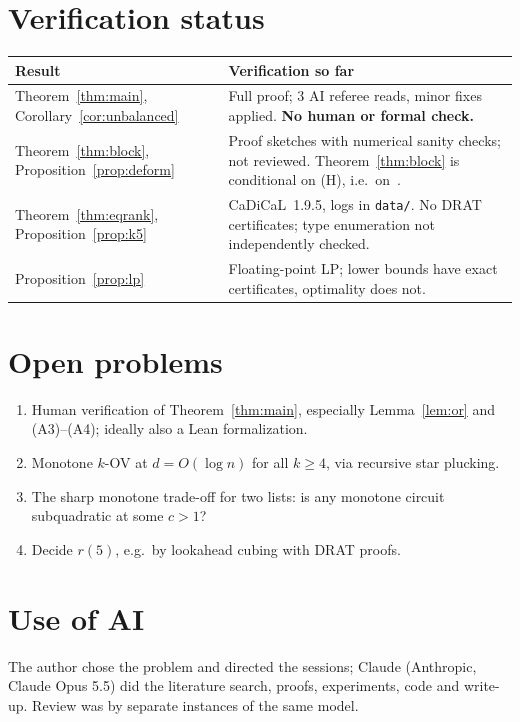 \documentclass[11pt,a4paper]{article}
\theoremstyle{plain}
\theoremstyle{definition}
\theoremstyle{remark}
\newcommand{\code}[1]{\texttt{\small #1}}
\begin{document}
\section{Verification status}
\begin{center}
\renewcommand{\arraystretch}{1.15}
\begin{tabularx}{\textwidth}{@{}l X@{}}
\toprule
Result & Verification so far\\
\midrule
Theorem~\ref{thm:main}, Corollary~\ref{cor:unbalanced} & Full proof; 3 AI referee reads, minor fixes
applied. \textbf{No human or formal check.}\\
Theorem~\ref{thm:block}, Proposition~\ref{prop:deform} & Proof sketches with numerical sanity checks; not
reviewed. Theorem~\ref{thm:block} is conditional on (H), i.e.\ on~\cite{OpenAI26,Anthropic26}.\\
Theorem~\ref{thm:eqrank}, Proposition~\ref{prop:k5} & CaDiCaL~1.9.5, logs in \code{data/}. No DRAT certificates; type
enumeration not independently checked.\\
Proposition~\ref{prop:lp} & Floating-point LP; lower bounds have exact certificates, optimality does not.\\
\bottomrule
\end{tabularx}
\end{center}

\section{Open problems}
\begin{enumerate}
  \item Human verification of Theorem~\ref{thm:main}, especially Lemma~\ref{lem:or} and (A3)--(A4); ideally also a
    Lean formalization.
  \item Monotone $k$-OV at $d=O(\log n)$ for all $k\ge4$, via recursive star plucking.
  \item The sharp monotone trade-off for two lists: is any monotone circuit subquadratic at some $c>1$?
  \item Decide $r(5)$, e.g.\ by lookahead cubing with DRAT proofs.
\end{enumerate}

\section*{Use of AI}
The author chose the problem and directed the sessions; Claude (Anthropic, Claude Opus 5.5) did the literature
search, proofs, experiments, code and write-up. Review was by separate instances of the same model.
\end{document}
